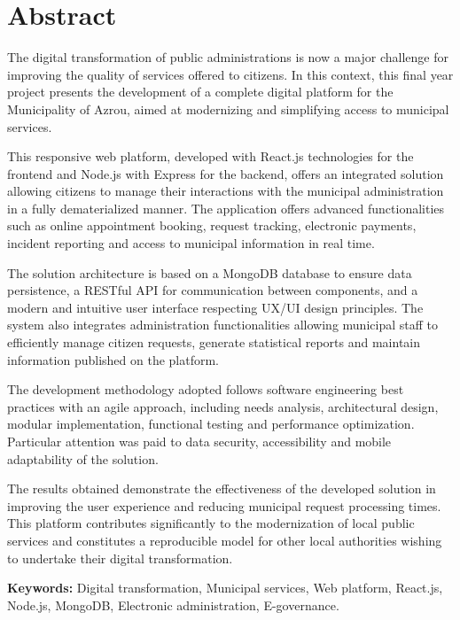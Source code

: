 \chapter*{Abstract}

The digital transformation of public administrations is now a major challenge for improving the quality of services offered to citizens. In this context, this final year project presents the development of a complete digital platform for the Municipality of Azrou, aimed at modernizing and simplifying access to municipal services.

This responsive web platform, developed with React.js technologies for the frontend and Node.js with Express for the backend, offers an integrated solution allowing citizens to manage their interactions with the municipal administration in a fully dematerialized manner. The application offers advanced functionalities such as online appointment booking, request tracking, electronic payments, incident reporting and access to municipal information in real time.

The solution architecture is based on a MongoDB database to ensure data persistence, a RESTful API for communication between components, and a modern and intuitive user interface respecting UX/UI design principles. The system also integrates administration functionalities allowing municipal staff to efficiently manage citizen requests, generate statistical reports and maintain information published on the platform.

The development methodology adopted follows software engineering best practices with an agile approach, including needs analysis, architectural design, modular implementation, functional testing and performance optimization. Particular attention was paid to data security, accessibility and mobile adaptability of the solution.

The results obtained demonstrate the effectiveness of the developed solution in improving the user experience and reducing municipal request processing times. This platform contributes significantly to the modernization of local public services and constitutes a reproducible model for other local authorities wishing to undertake their digital transformation.

\textbf{Keywords:} Digital transformation, Municipal services, Web platform, React.js, Node.js, MongoDB, Electronic administration, E-governance.
